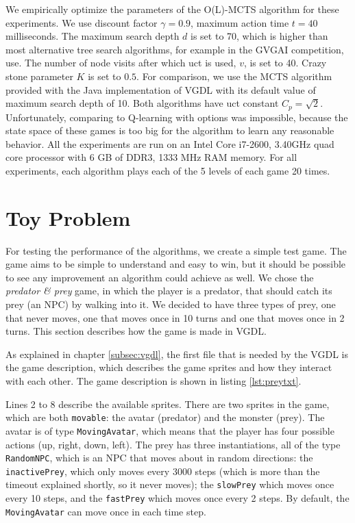 We empirically optimize the parameters of the O(L)-MCTS algorithm
for these experiments. We use discount factor $\gamma = 0.9$, maximum action
time $t = 40$ milliseconds. The maximum search depth $d$ is set to 70, which is
higher than most alternative tree search algorithms, for example in the GVGAI
competition, use. The number of node visits after which \textsf{uct} is used,
$v$, is set to 40. Crazy stone parameter $K$ is set to $0.5$.  For comparison,
we use the MCTS algorithm provided with the Java implementation of VGDL with its
default value of maximum search depth of 10. Both algorithms have \textsf{uct}
constant $C_p = \sqrt{2}$. Unfortunately, comparing to Q-learning with options
was impossible, because the state space of these games is too big for the
algorithm to learn any reasonable behavior. All the experiments are run on an
Intel %
Core %
i7-2600, 3.40GHz quad core processor with 6 GB of DDR3, 1333 MHz RAM memory. For
all experiments, each algorithm plays each of the 5 levels of each game 20
times. 

\section{Toy Problem}





For testing the performance of the algorithms, we create a simple test game. The
game aims to be simple to understand and easy to win, but it should be possible
to see any improvement an algorithm could achieve as well. We chose the
\emph{predator \& prey} game, in which the player is a predator, that should
catch its prey (an NPC) by walking into it. We decided to have three types of
prey, one that never moves, one that moves once in 10 turns and one that moves
once in 2 turns. This section describes how the game is made in VGDL.

As explained in chapter \ref{subsec:vgdl}, the first file that is needed by the
VGDL is the game description, which describes the game sprites and how they
interact with each other. The game description is shown in listing
\ref{lst:preytxt}.

Lines 2 to 8 describe the available sprites. There are two sprites in the game,
which are both \texttt{movable}: the avatar (predator) and the monster (prey).
The avatar is of type \texttt{MovingAvatar}, which means that the player has
four possible actions (up, right, down, left). The prey has three
instantiations, all of the type \texttt{RandomNPC}, which is an NPC that moves
about in random directions: the \texttt{inactivePrey}, which only moves every
3000 steps (which is more than the timeout explained shortly, so it never
moves); the \texttt{slowPrey} which moves once every 10 steps, and the
\texttt{fastPrey} which moves once every 2 steps.  By default, the
\texttt{MovingAvatar} can move once in each time step.

